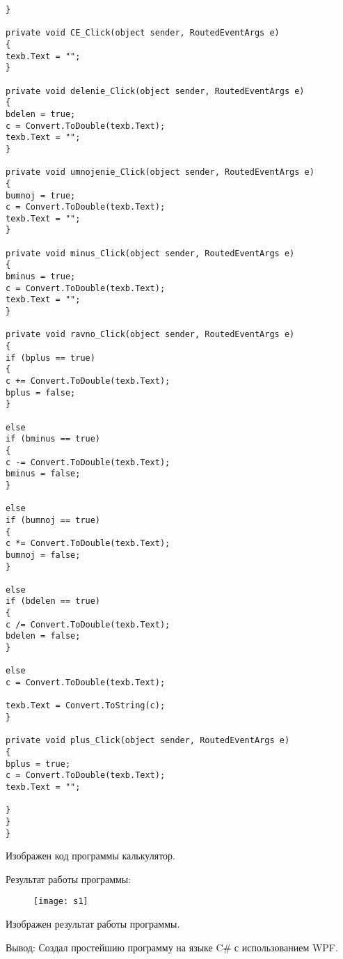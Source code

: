 \begin{verbatim}
}

private void CE_Click(object sender, RoutedEventArgs e)
{
texb.Text = "";
}

private void delenie_Click(object sender, RoutedEventArgs e)
{
bdelen = true;
c = Convert.ToDouble(texb.Text);
texb.Text = "";
}

private void umnojenie_Click(object sender, RoutedEventArgs e)
{
bumnoj = true;
c = Convert.ToDouble(texb.Text);
texb.Text = "";
}

private void minus_Click(object sender, RoutedEventArgs e)
{
bminus = true;
c = Convert.ToDouble(texb.Text);
texb.Text = "";
}

private void ravno_Click(object sender, RoutedEventArgs e)
{
if (bplus == true)
{
c += Convert.ToDouble(texb.Text);
bplus = false;
}

else
if (bminus == true)
{
c -= Convert.ToDouble(texb.Text);
bminus = false;
}

else
if (bumnoj == true)
{
c *= Convert.ToDouble(texb.Text);
bumnoj = false;
}

else
if (bdelen == true)
{
c /= Convert.ToDouble(texb.Text);
bdelen = false;
}

else
c = Convert.ToDouble(texb.Text);

texb.Text = Convert.ToString(c);              
}

private void plus_Click(object sender, RoutedEventArgs e)
{
bplus = true;
c = Convert.ToDouble(texb.Text);
texb.Text = "";

}
}
}
\end{verbatim}
Изображен код программы калькулятор.
\begin{center}
Результат работы программы:
\end{center}

\begin{figure}[h]
	\centering
	\texttt{[image: s1]}

	\label{fig:s1}
\end{figure}
Изображен результат работы программы.

Вывод: Создал простейшию программу на языке C\# с использованием WPF. 



